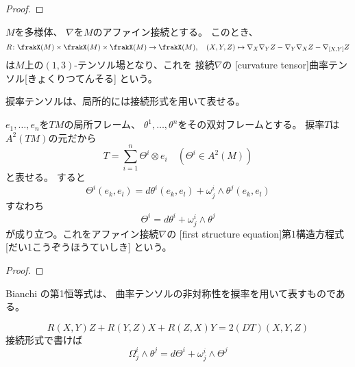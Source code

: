 \documentclass[report]{jlreq}
\begin{document}
\begin{proof}
    \TODO{}
\end{proof}

\begin{definition}[曲率テンソル]
    $M$を多様体、
    $\nabla$を$M$のアファイン接続とする。
    このとき、
    \begin{equation}
        R \colon
            \frakX(M) \times \frakX(M) \times \frakX(M)
            \to \frakX(M),
        \quad
        (X, Y, Z)
            \mapsto \nabla_X \nabla_Y Z - \nabla_Y \nabla_X Z - \nabla_{[X, Y]} Z
    \end{equation}
    は$M$上の$(1, 3)$-テンソル場となり、これを
    接続$\nabla$の
    [curvature tensor]{曲率テンソル}[きょくりつてんそる]
    という。
\end{definition}

捩率テンソルは、局所的には接続形式を用いて表せる。

\begin{proposition}[第1構造方程式]
    $e_1, \dots, e_n$を$TM$の局所フレーム、
    $\theta^1, \dots, \theta^n$をその双対フレームとする。
    捩率$T$は$A^2(TM)$の元だから
    \begin{equation}
        T = \sum_{i = 1}^n \Theta^i \otimes e_i
            \quad (\Theta^i \in A^2(M))
    \end{equation}
    と表せる。
    すると
    \begin{equation}
        \Theta^i(e_k, e_l) = d\theta^i(e_k, e_l) + \omega^i_j \wedge \theta^j (e_k, e_l)
    \end{equation}
    すなわち
    \begin{equation}
        \Theta^i = d\theta^i + \omega^i_j \wedge \theta^j
    \end{equation}
    が成り立つ。これをアファイン接続$\nabla$の
    [first structure equation]{第1構造方程式}[だい1こうぞうほうていしき]
    という。
\end{proposition}

\begin{proof}
    \TODO{}
\end{proof}

Bianchi の第1恒等式は、
曲率テンソルの非対称性を捩率を用いて表すものである。

\begin{proposition}
    \begin{equation}
        R(X, Y)Z + R(Y, Z)X + R(Z, X)Y = 2(DT)(X, Y, Z)
    \end{equation}
    接続形式で書けば
    \begin{equation}
        \Omega^i_j \wedge \theta^j = d\Theta^i + \omega^i_j \wedge \Theta^j
    \end{equation}
    \TODO{}
\end{proposition}
\end{document}
